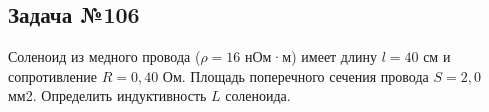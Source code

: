 \subsection{Задача №106}

Соленоид из медного провода ($\rho = 16$ нОм·м) имеет длину $l = 40$ см и сопротивление $R = 0,40$ Ом. Площадь поперечного сечения провода $S = 2,0$ мм2. Определить индуктивность $L$ соленоида.